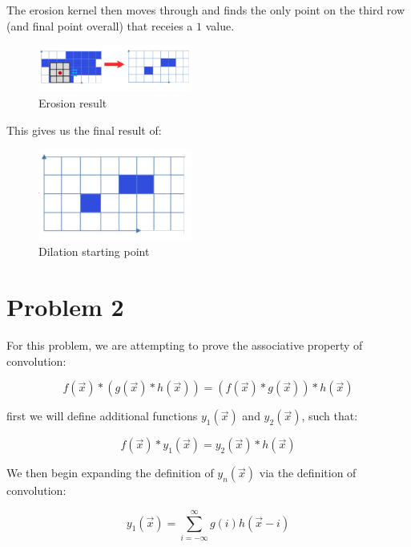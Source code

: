 \documentclass{article}
\begin{document}
The erosion kernel then moves through and finds the only point on the third row (and final point overall) that receies a $1$ value.

\begin{figure}[H]
    \centering
    \includegraphics[width = 0.45\textwidth]{imgs/5/b12.png}
    \caption{Erosion result}
    \label{fig:b12}
\end{figure}

This gives us the final result of:

\begin{figure}[H]
    \centering
    \includegraphics[width = 0.45\textwidth]{imgs/5/b13.png}
    \caption{Dilation starting point}
    \label{fig:b13}
\end{figure}

\section*{Problem 2}

For this problem, we are attempting to prove the associative property of convolution:

\begin{equation}
    f(\vec{x})*(g(\vec{x})*h(\vec{x})) = (f(\vec{x})*g(\vec{x}))*h(\vec{x})
\end{equation}

first we will define additional functions $y_1(\vec{x})$ and $y_2(\vec{x})$, such that:

\begin{equation}
    f(\vec{x})*y_1(\vec{x}) = y_2(\vec{x})*h(\vec{x})
\end{equation}

We then begin expanding the definition of $y_n(\vec{x})$ via the definition of convolution:

\begin{equation}
    y_1(\vec{x}) = \sum^\infty_{i=-\infty} g(i) h(\vec{x}-i)
\end{equation}
\end{document}
